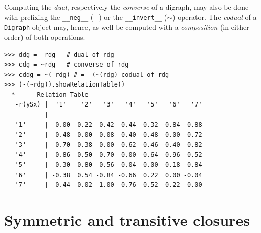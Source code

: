 Computing the \emph{dual}, respectively the \emph{converse} of a digraph, may also be done with prefixing the \texttt{\_\_neg\_\_} ($-$) or the \texttt{\_\_invert\_\_} ($\sim$) operator. The \emph{codual} of a \texttt{Digraph} object may, hence, as well be computed with a \emph{composition} (in either order) of both operations.
\begin{lstlisting}[caption={Computing the dual, the converse and the codual of a digraph},label=list:2.8]
>>> ddg = -rdg   # dual of rdg
>>> cdg = ~rdg   # converse of rdg
>>> cddg = ~(-rdg) # = -(~(rdg) codual of rdg
>>> (-(~rdg)).showRelationTable()
  * ---- Relation Table -----
   -r(ySx) |  '1'    '2'   '3'   '4'   '5'   '6'   '7'	    
   --------|------------------------------------------
   '1'     |  0.00  0.22  0.42 -0.44 -0.32  0.84 -0.88	 
   '2'     |  0.48  0.00 -0.08  0.40  0.48  0.00 -0.72	 
   '3'     | -0.70  0.38  0.00  0.62  0.46  0.40 -0.82	 
   '4'     | -0.86 -0.50 -0.70  0.00 -0.64  0.96 -0.52	 
   '5'     | -0.30 -0.80  0.56 -0.04  0.00  0.18  0.84	 
   '6'     | -0.38  0.54 -0.84 -0.66  0.22  0.00 -0.04	 
   '7'     | -0.44 -0.02  1.00 -0.76  0.52  0.22  0.00	 
\end{lstlisting}
  
\section{Symmetric and transitive closures}
\label{sec:2.7}

